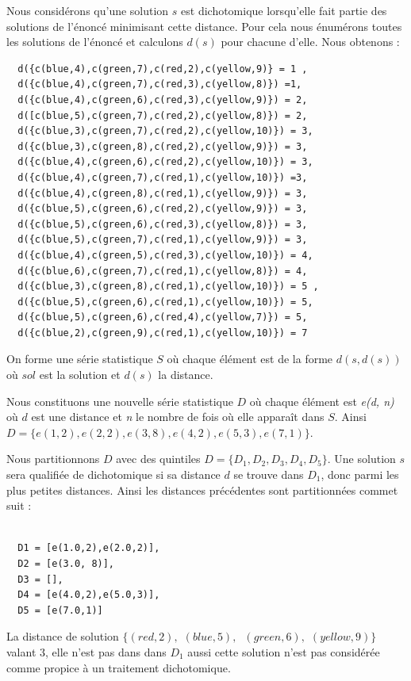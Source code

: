 \documentclass[a4paper, 12]{article}
\newcommand\set[1]{\ensuremath{\{#1\}}}
\begin{document}
Nous considérons qu’une solution $s$ est dichotomique lorsqu’elle fait partie des solutions de l’énoncé minimisant cette distance. Pour cela nous énumérons toutes les solutions de l’énoncé et calculons $d(s)$ pour chacune d’elle. Nous obtenons :

\begin{verbatim}
  d({c(blue,4),c(green,7),c(red,2),c(yellow,9)} = 1 ,
  d({c(blue,4),c(green,7),c(red,3),c(yellow,8)}) =1,
  d({c(blue,4),c(green,6),c(red,3),c(yellow,9)}) = 2,
  d([c(blue,5),c(green,7),c(red,2),c(yellow,8)}) = 2,
  d({c(blue,3),c(green,7),c(red,2),c(yellow,10)}) = 3,
  d({c(blue,3),c(green,8),c(red,2),c(yellow,9)}) = 3,
  d({c(blue,4),c(green,6),c(red,2),c(yellow,10)}) = 3,
  d({c(blue,4),c(green,7),c(red,1),c(yellow,10)}) =3,
  d({c(blue,4),c(green,8),c(red,1),c(yellow,9)}) = 3,
  d({c(blue,5),c(green,6),c(red,2),c(yellow,9)}) = 3,
  d({c(blue,5),c(green,6),c(red,3),c(yellow,8)}) = 3,
  d({c(blue,5),c(green,7),c(red,1),c(yellow,9)}) = 3,
  d({c(blue,4),c(green,5),c(red,3),c(yellow,10)}) = 4,
  d({c(blue,6),c(green,7),c(red,1),c(yellow,8)}) = 4,
  d({c(blue,3),c(green,8),c(red,1),c(yellow,10)}) = 5 ,
  d({c(blue,5),c(green,6),c(red,1),c(yellow,10)}) = 5,
  d({c(blue,5),c(green,6),c(red,4),c(yellow,7)}) = 5,
  d({c(blue,2),c(green,9),c(red,1),c(yellow,10)}) = 7
\end{verbatim}

On forme une série statistique $S$ où chaque élément est de la forme $d(s, d(s))$ où $sol$ est la solution et $d(s)$ la distance.

Nous constituons une nouvelle série statistique $D$ où chaque élément est \emph{e(d, n)} où $d$ est une distance et \emph{n}  le nombre de fois où elle apparaît dans $S$. Ainsi 
$D = \set{e(1, 2), e(2, 2), e(3, 8), e(4, 2), e(5, 3), e(7, 1) }$.

Nous partitionnons $D$ avec des quintiles $D = \set{D_1, D_2, D_3, D_4, D_5}$. Une solution $s$ sera qualifiée de dichotomique si sa distance $d$ se trouve dans $D_1$, donc parmi les plus petites distances. Ainsi les distances précédentes sont partitionnées commet suit :
\begin{verbatim}

  D1 = [e(1.0,2),e(2.0,2)],
  D2 = [e(3.0, 8)],
  D3 = [],
  D4 = [e(4.0,2),e(5.0,3)],
  D5 = [e(7.0,1)]
\end{verbatim}

La distance de solution  \emph{$\{(red,2),$ $(blue,5),\ $ $ (green,6),$ $(yellow,9)\}$} valant $3$, elle n’est pas dans dans $D_1$ aussi cette solution n’est pas considérée comme propice à un traitement dichotomique.
\end{document}
